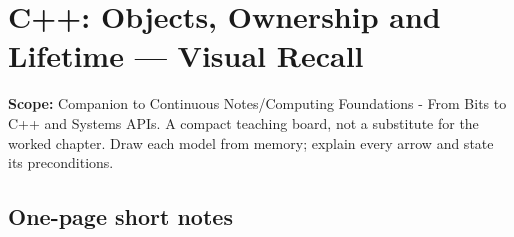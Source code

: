 \hypertarget{appendix-960160274237}{}\label{referencestart:appendix-960160274237}
\section{C++: Objects, Ownership and Lifetime --- Visual Recall}\label{appendix-960160274237-c-objects-ownership-and-lifetime-visual-recall}

\hypertarget{appendix-960160274237-c-objects-ownership-and-lifetime-visual-recall}{}

\textbf{Scope:} Companion to {Continuous Notes/Computing Foundations - From Bits to C++ and Systems APIs}. A compact teaching board, not a substitute for the worked chapter. Draw each model from memory; explain every arrow and state its preconditions.

\subsection{One-page short notes}\label{appendix-960160274237-one-page-short-notes}

\hypertarget{appendix-960160274237-one-page-short-notes}{}


